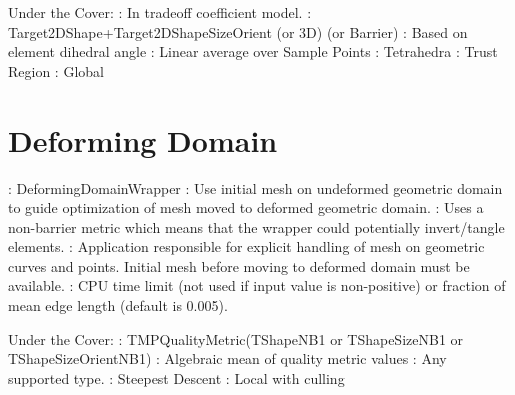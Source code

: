 \noindent Under the Cover: \newline
{}: In tradeoff coefficient model. \newline
{}: Target2DShape+Target2DShapeSizeOrient (or 3D) (or Barrier) \newline
{}: Based on element dihedral angle \newline
{}: Linear average over Sample Points \newline
{}: Tetrahedra \newline
{}: Trust Region \newline
{}: Global \newline


\section{Deforming Domain} \label{sec:DeformingDomain}

: DeformingDomainWrapper \newline
{}:  Use initial mesh on undeformed geometric domain
to guide optimization of mesh moved to deformed geometric domain.  \newline
{}: Uses a non-barrier metric which means that the
wrapper could potentially invert/tangle elements.  \newline
{}:  Application responsible for explicit handling of mesh on geometric curves and points.  Initial mesh before moving to deformed domain must be available.\newline 
{}: CPU time limit (not used if input 
value is non-positive) or fraction of mean edge length (default is 0.005). \newline \newline

\noindent Under the Cover: \newline
{}: TMPQualityMetric(TShapeNB1 or TShapeSizeNB1 or TShapeSizeOrientNB1) \newline
{}: Algebraic mean of quality metric values \newline
{}: Any supported type. \newline
{}: Steepest Descent \newline
{}: Local with culling \newline
